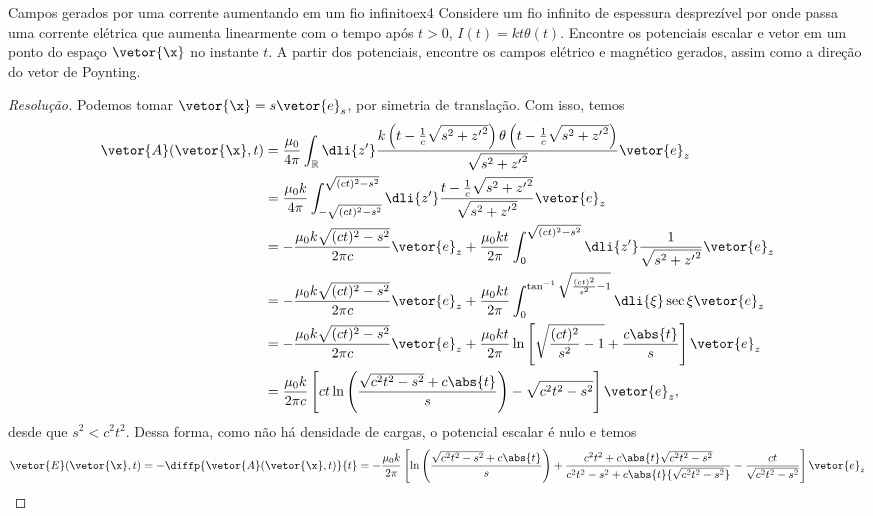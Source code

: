 \begin{exercício}{Campos gerados por uma corrente aumentando em um fio infinito}{ex4}
   Considere um fio infinito de espessura desprezível por onde passa uma corrente elétrica que aumenta linearmente com o tempo após \(t > 0\), \(I(t) = kt\theta(t)\). Encontre os potenciais escalar e vetor em um ponto do espaço \(\vetor{\x}\) no instante \(t\). A partir dos potenciais, encontre os campos elétrico e magnético gerados, assim como a direção do vetor de Poynting.
\end{exercício}
\begin{proof}[Resolução]
   Podemos tomar \(\vetor{\x} = s \vetor{e}_s\), por simetria de translação. Com isso, temos
   \begin{align*}
      \vetor{A}(\vetor{\x}, t) &= \frac{\mu_0}{4\pi} \int_{\mathbb{R}} \dli{z'} \frac{k \left(t - \frac1c\sqrt{s^2 + {z'}^2}\right) \theta\left(t - \frac1c\sqrt{s^2 + {z'}^2}\right)}{\sqrt{s^2 + {z'}^2}}\vetor{e}_z\\
                               &= \frac{\mu_0 k}{4\pi} \int_{-\sqrt{(ct)^2 - s^2}}^{\sqrt{(ct)^2 - s^2}} \dli{z'} \frac{t - \frac1c \sqrt{s^2 + {z'}^2}}{\sqrt{s^2 + {z'}^2}}\vetor{e}_z\\
                               &= -\frac{\mu_0 k\sqrt{(ct)^2 - s^2}}{2\pi c}\vetor{e}_z + \frac{\mu_0 kt}{2\pi} \int_{0}^{\sqrt{(ct)^2 - s^2}} \dli{z'} \frac{1}{\sqrt{s^2 + {z'}^2}}\vetor{e}_z\\
                               &= -\frac{\mu_0 k\sqrt{(ct)^2 - s^2}}{2\pi c}\vetor{e}_z+ \frac{\mu_0 kt}{2\pi} \int_{0}^{\tan^{-1}\sqrt{\frac{(ct)^2}{s^2} - 1}} \dli{\xi} \sec\xi\vetor{e}_z\\
                               &= -\frac{\mu_0 k\sqrt{(ct)^2 - s^2}}{2\pi c}\vetor{e}_z + \frac{\mu_0 kt}{2\pi} \ln\left[\sqrt{\frac{(ct)^2}{s^2} - 1} + \frac{c\abs{t}}{s}\right] \vetor{e}_z\\
                               &= \frac{\mu_0 k}{2\pi c} \left[ct \ln\left(\frac{\sqrt{c^2 t^2 - s^2} + c \abs{t}}{s}\right) - \sqrt{c^2 t^2 - s^2}\right] \vetor{e}_z,
   \end{align*}
   desde que \(s^2 < c^2 t^2.\) Dessa forma, como não há densidade de cargas, o potencial escalar é nulo e temos
   \begin{align*}
      \vetor{E}(\vetor{\x}, t) = -\diffp{\vetor{A}(\vetor{\x}, t)}{t} 
      &= -\frac{\mu_0 k}{2\pi} \left[\ln\left(\frac{\sqrt{c^2 t^2 - s^2} + c \abs{t}}{s}\right)  + \frac{c^2 t^2 + c \abs{t} \sqrt{c^2 t^2 - s^2}}{c^2 t^2 - s^2 + c \abs{t}{\sqrt{c^2 t^2 - s^2}}} - \frac{c t}{\sqrt{c^2 t^2 - s^2}}\right] \vetor{e}_z\\

\end{align*}
\end{proof}
